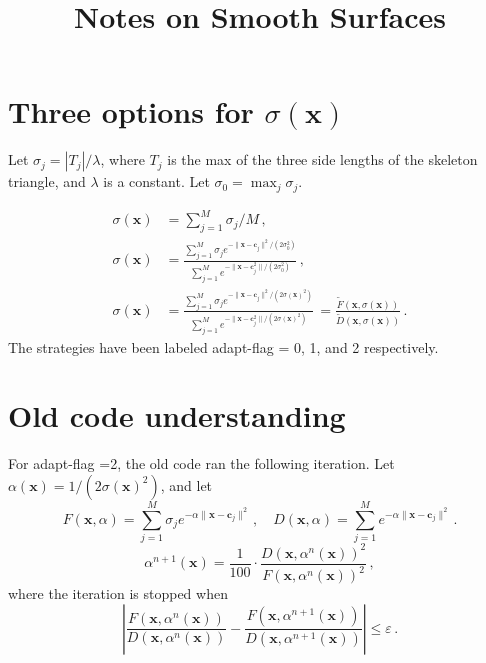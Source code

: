 \documentclass[11pt, oneside]{article}   	%
\title{Notes on Smooth Surfaces}
\newcommand\bx{\boldsymbol x}
\newcommand\bc{\boldsymbol c}
\begin{document}
\maketitle

\section{Three options for $\sigma(\bx)$}
Let $\sigma_{j} = |T_{j}|/\lambda$, 
where $T_{j}$ is the max of the three side lengths of the skeleton triangle,
and $\lambda$ is a constant. Let $\sigma_{0} = \max_{j} \sigma_{j}$.

\begin{align}
\sigma(\bx) &= \sum_{j=1}^{M} \sigma_{j}/M \, ,\\ 
\sigma(\bx) &= \frac{\sum_{j=1}^{M} \sigma_{j} e^{-\| \bx -\bc_{j} \|^2/(2\sigma_{0}^2)}}
{\sum_{j=1}^{M} e^{-\|\bx-\bc_{j}^2 \|/(2\sigma_{0}^2)}} \, ,\\ 
\sigma(\bx) &= \frac{\sum_{j=1}^{M} \sigma_{j} e^{-\| \bx -\bc_{j} \|^2/(2\sigma(\bx)^2)}}
{\sum_{j=1}^{M} e^{-\|\bx-\bc_{j}^2 \|/(2\sigma(\bx)^2)}} \, = \frac{\tilde{F}(\bx,\sigma(\bx))}{\tilde{D}(\bx,\sigma(\bx))} \, .
\label{eq:adapt-flag2}
\end{align}
The strategies have been labeled adapt-flag = 0, 1, and 2 respectively.

\section{Old code understanding}
For adapt-flag =2, the old code ran the following iteration. Let $\alpha(\bx) = 1/(2\sigma(\bx)^2)$,
and let 
\begin{equation}
F(\bx,\alpha) = \sum_{j=1}^{M} \sigma_{j} e^{-\alpha \| \bx -\bc_{j} \|^2} \, , \quad
D(\bx,\alpha) = \sum_{j=1}^{M}  e^{-\alpha \| \bx -\bc_{j} \|^2} \, . 
\end{equation}
\begin{equation}
\alpha^{n+1}(\bx) = \frac{1}{100}\cdot \frac{D(\bx,\alpha^{n}(\bx))^2}{F(\bx,\alpha^{n}(\bx))^2} \, ,
\end{equation}
where the iteration is stopped when
\begin{equation}
\left|\frac{F(\bx,\alpha^{n}(\bx))}{D(\bx,\alpha^{n}(\bx))} - 
\frac{F(\bx,\alpha^{n+1}(\bx))}{D(\bx,\alpha^{n+1}(\bx))} \right| \leq \varepsilon \, .
\end{equation}
\end{document}
